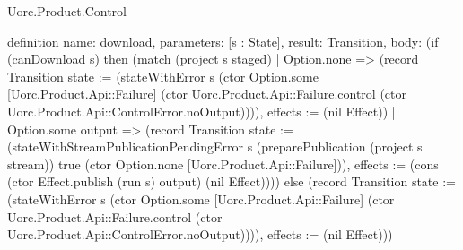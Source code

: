 \begin{lexlean}{Uorc.Product.Control}
\begin{semanticmodule}
definition{
  name: download,
  parameters: [s : State],
  result: Transition,
  body: (if (canDownload s) then (match (project s staged)
    | Option.none => (record Transition {state := (stateWithError s (ctor Option.some [Uorc.Product.Api::Failure] (ctor Uorc.Product.Api::Failure.control (ctor Uorc.Product.Api::ControlError.noOutput)))), effects := (nil Effect)})
    | Option.some output => (record Transition {state := (stateWithStreamPublicationPendingError s (preparePublication (project s stream)) true (ctor Option.none [Uorc.Product.Api::Failure])), effects := (cons (ctor Effect.publish (run s) output) (nil Effect))})) else (record Transition {state := (stateWithError s (ctor Option.some [Uorc.Product.Api::Failure] (ctor Uorc.Product.Api::Failure.control (ctor Uorc.Product.Api::ControlError.noOutput)))), effects := (nil Effect)}))
}


\end{semanticmodule}
\end{lexlean}
